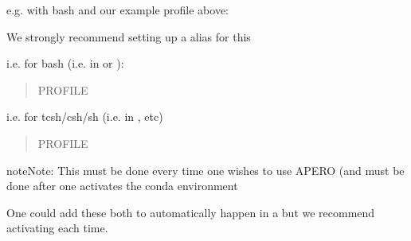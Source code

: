 \documentclass[a4paper,10pt,english]{report}
\begin{document}
e.g. with bash and our example profile above:
\begin{quote}

\begin{sphinxVerbatim}[commandchars=\\\{\}]
 
\end{sphinxVerbatim}
\end{quote}

We strongly recommend setting up a alias for this

i.e. for bash (i.e. in   or ):
\begin{quote}

\begin{sphinxVerbatim}[commandchars=\\\{\}]
 PROFILE
\end{sphinxVerbatim}
\end{quote}

i.e. for tcsh/csh/sh  (i.e. in ,  etc)
\begin{quote}

\begin{sphinxVerbatim}[commandchars=\\\{\}]
 PROFILE 
\end{sphinxVerbatim}
\end{quote}

\begin{sphinxadmonition}{note}{Note:}
This must be done every time one wishes to use APERO (and must be
done after one activates the conda environment


One could add these both to automatically happen in a  but
we recommend activating each time.
\end{sphinxadmonition}
\end{document}
